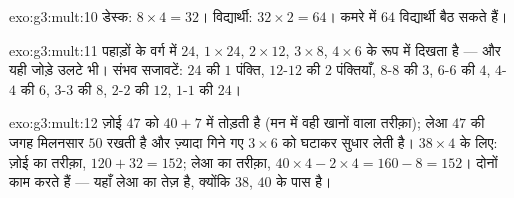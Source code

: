 \begin{solution}{exo:g3:mult:10}
डेस्क: $8 \times 4 = 32$। विद्यार्थी: $32 \times 2 = 64$। कमरे
में $64$ विद्यार्थी बैठ सकते हैं।
\end{solution}

\begin{solution}{exo:g3:mult:11}
पहाड़ों के वर्ग में $24$, $1 \times 24$, $2 \times 12$,
$3 \times 8$, $4 \times 6$ के रूप में दिखता है --- और यही जोड़े
उलटे भी। संभव सजावटें: $24$ की $1$ पंक्ति, $12$-$12$ की $2$
पंक्तियाँ, $8$-$8$ की $3$, $6$-$6$ की $4$, $4$-$4$ की $6$,
$3$-$3$ की $8$, $2$-$2$ की $12$, $1$-$1$ की $24$।
\end{solution}

\begin{solution}{exo:g3:mult:12}
ज़ोई $47$ को $40 + 7$ में तोड़ती है (मन में वही खानों वाला
तरीक़ा); लेआ $47$ की जगह मिलनसार $50$ रखती है और ज़्यादा गिने
गए $3 \times 6$ को घटाकर सुधार लेती है। $38 \times 4$ के लिए:
ज़ोई का तरीक़ा, $120 + 32 = 152$; लेआ का तरीक़ा,
$40 \times 4 - 2 \times 4 = 160 - 8 = 152$। दोनों काम करते
हैं --- यहाँ लेआ का तेज़ है, क्योंकि $38$, $40$ के पास है।

\end{solution}
